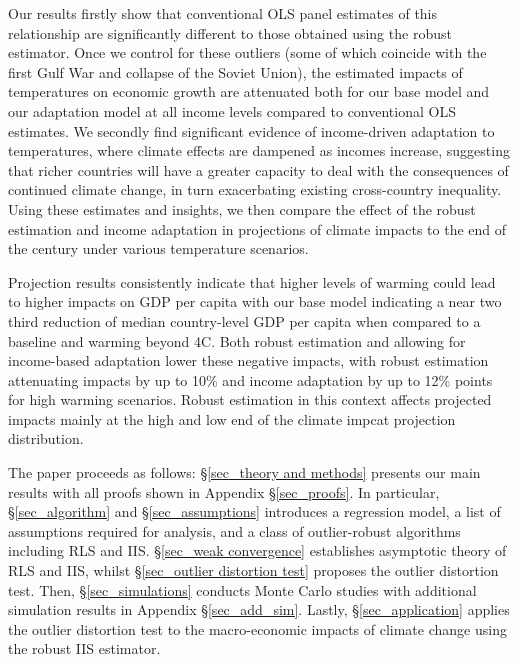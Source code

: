 \documentclass[11pt, letterpaper]{article}
\numberwithin{algorithm}{section}
\numberwithin{assumption}{section}
\numberwithin{lemma}{section}
\numberwithin{theorem}{section}
\numberwithin{corollary}{section}
\numberwithin{remark}{section}
\numberwithin{equation}{section}
\numberwithin{figure}{section}
\numberwithin{table}{section}
\begin{document}
Our results firstly show that conventional OLS panel estimates of this relationship are significantly different to those obtained using the robust estimator. Once we control for these outliers (some of which coincide with the first Gulf War and collapse of the Soviet Union), the estimated impacts of temperatures on economic growth are attenuated both for our base model and our adaptation model at all income levels compared to conventional OLS estimates. We secondly find significant evidence of income-driven adaptation to temperatures, where climate effects are dampened as incomes increase, suggesting that richer countries will have a greater capacity to deal with the consequences of continued climate change, in turn exacerbating existing cross-country inequality. Using these estimates and insights, we then compare the effect of the robust estimation and income adaptation in projections of climate impacts to the end of the century under various temperature scenarios.

Projection results consistently indicate that higher levels of warming could lead to higher impacts on GDP per capita with our base model indicating a near two third reduction of median country-level GDP per capita when compared to a baseline and warming beyond 4\textdegree C. Both robust estimation and allowing for income-based adaptation lower these negative impacts, with robust estimation attenuating impacts by up to 10\% and income adaptation by up to 12\% points for high warming scenarios. Robust estimation in this context affects projected impacts mainly at the high and low end of the climate impcat projection distribution.

The paper proceeds as follows: \S \ref{sec_theory and methods} presents our main results with all proofs shown in Appendix \S \ref{sec_proofs}. In particular, \S \ref{sec_algorithm} and \S \ref{sec_assumptions} introduces a regression model, a list of assumptions required for analysis, and a class of outlier-robust algorithms including RLS and IIS. \S \ref{sec_weak convergence} establishes asymptotic theory of RLS and IIS, whilst \S \ref{sec_outlier distortion test} proposes the outlier distortion test. Then, \S \ref{sec_simulations} conducts Monte Carlo studies with additional simulation results in Appendix \S \ref{sec_add_sim}. Lastly, \S \ref{sec_application} applies the outlier distortion test to the macro-economic impacts of climate change using the robust IIS estimator.
\end{document}
